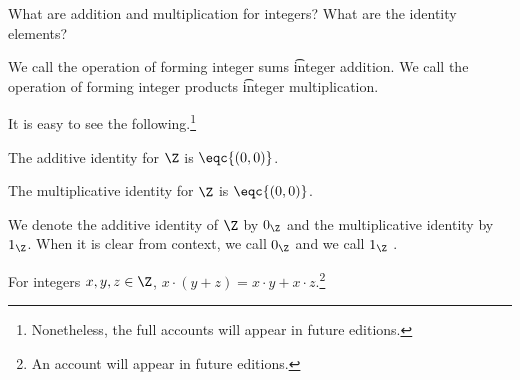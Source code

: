 

What are addition and multiplication for integers?
What are the identity elements?



We call the operation of forming integer sums \t{integer addition}.
We call the operation of forming integer products \t{integer multiplication}.


It is easy to see the following.\footnote{Nonetheless, the full accounts will appear in future editions.}

\begin{proposition}
  The additive identity for $\Z$ is $\eqc{(0, 0)}$.
\end{proposition}

\begin{proposition}
  The multiplicative identity for $\Z$ is $\eqc{(0, 0)}$.
\end{proposition}


We denote the additive identity of $\Z$ by $0_{\Z}$ and the multiplicative identity by $1_{\Z}$.
When it is clear from context, we call $0_{\Z}$  and we call $1_{\Z}$ .


\begin{proposition}
  For integers $x, y, z \in \Z$, $x \cdot (y + z) = x\cdot y + x\cdot z$.\footnote{An account will appear in future editions.}
\end{proposition}

\blankpage
